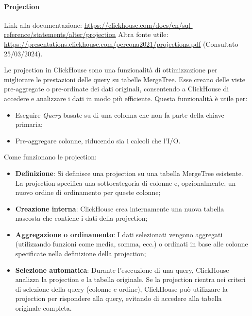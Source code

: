 \paragraph{Projection}\label{sec:projections}
Link alla documentazione: \href{https://clickhouse.com/docs/en/sql-reference/statements/alter/projection}{https://clickhouse.com/docs/en/sql-reference/statements/alter/projection}\newline
Altra fonte utile: \href{https://presentations.clickhouse.com/percona2021/projections.pdf}{https://presentations.clickhouse.com/percona2021/projections.pdf} (Consultato 25/03/2024). \newline

Le projection in ClickHouse sono una funzionalità di ottimizzazione per migliorare le prestazioni delle query su tabelle MergeTree. Esse creano delle viste pre-aggregate o pre-ordinate dei dati originali, consentendo a ClickHouse di accedere e analizzare i dati in modo più efficiente.
Questa funzionalità è utile per:

\begin{itemize}
    \item Eseguire \textit{Query} basate su di una colonna che non fa parte della chiave primaria;
    \item Pre-aggregare colonne, riducendo sia i calcoli che l'I/O.
\end{itemize}

Come funzionano le projection:
\begin{itemize}
  \item \textbf{Definizione}: Si definisce una projection su una tabella MergeTree esistente. La projection specifica una sottocategoria di colonne e, opzionalmente, un nuovo ordine di ordinamento per queste colonne;
  \item \textbf{Creazione interna}: ClickHouse crea internamente una nuova tabella nascosta che contiene i dati della projection;
  \item \textbf{Aggregazione o ordinamento}: I dati selezionati vengono aggregati (utilizzando funzioni come media, somma, ecc.) o ordinati in base alle colonne specificate nella definizione della projection;
  \item \textbf{Selezione automatica}: Durante l'esecuzione di una query, ClickHouse analizza la projection e la tabella originale. Se la projection rientra nei criteri di selezione della query (colonne e ordine), ClickHouse può utilizzare la projection per rispondere alla query, evitando di accedere alla tabella originale completa.
\end{itemize}

